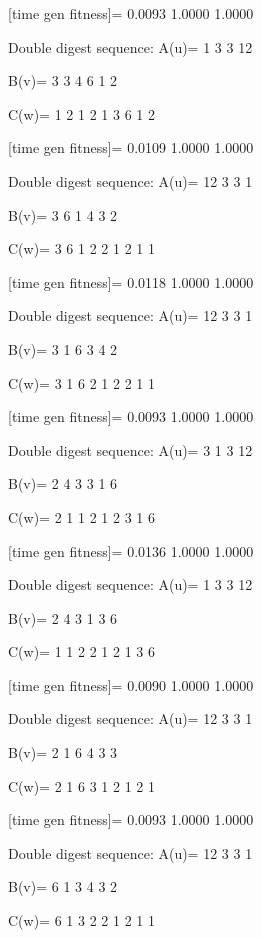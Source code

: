 [time gen fitness]=
    0.0093    1.0000    1.0000

Double digest sequence:
A(u)=
     1     3     3    12

B(v)=
     3     3     4     6     1     2

C(w)=
     1     2     1     2     1     3     6     1     2

[time gen fitness]=
    0.0109    1.0000    1.0000

Double digest sequence:
A(u)=
    12     3     3     1

B(v)=
     3     6     1     4     3     2

C(w)=
     3     6     1     2     2     1     2     1     1

[time gen fitness]=
    0.0118    1.0000    1.0000

Double digest sequence:
A(u)=
    12     3     3     1

B(v)=
     3     1     6     3     4     2

C(w)=
     3     1     6     2     1     2     2     1     1

[time gen fitness]=
    0.0093    1.0000    1.0000

Double digest sequence:
A(u)=
     3     1     3    12

B(v)=
     2     4     3     3     1     6

C(w)=
     2     1     1     2     1     2     3     1     6

[time gen fitness]=
    0.0136    1.0000    1.0000

Double digest sequence:
A(u)=
     1     3     3    12

B(v)=
     2     4     3     1     3     6

C(w)=
     1     1     2     2     1     2     1     3     6

[time gen fitness]=
    0.0090    1.0000    1.0000

Double digest sequence:
A(u)=
    12     3     3     1

B(v)=
     2     1     6     4     3     3

C(w)=
     2     1     6     3     1     2     1     2     1

[time gen fitness]=
    0.0093    1.0000    1.0000

Double digest sequence:
A(u)=
    12     3     3     1

B(v)=
     6     1     3     4     3     2

C(w)=
     6     1     3     2     2     1     2     1     1

